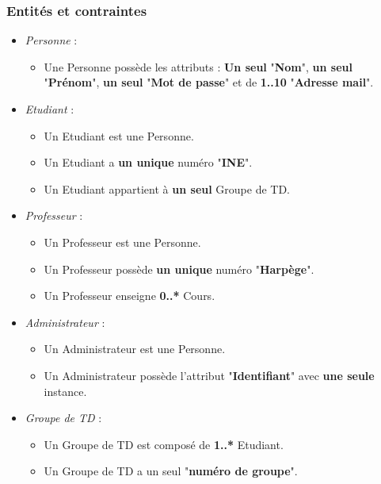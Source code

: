 \documentclass[a4paper, 11pt]{article}
\begin{document}
        \subsubsection{ Entités et contraintes}
        \begin{itemize}
        \item \textit{Personne} :
                \begin{itemize}
                \item Une Personne possède les attributs : \textbf{Un seul} "\textbf{Nom}", \textbf{un seul} "\textbf{Prénom}", \textbf{un seul} "\textbf{Mot de passe}" et de \textbf{1..10} "\textbf{Adresse mail}".
                \end{itemize}
        \item \textit{Etudiant} :
                \begin{itemize}
                \item Un Etudiant est une Personne.
                \item Un Etudiant a \textbf{un unique} numéro "\textbf{INE}".
                \item Un Etudiant appartient à \textbf{un seul} Groupe de TD.
                \end{itemize}
        \item \textit{Professeur} :
                \begin{itemize}
                \item Un Professeur est une Personne.
                \item Un Professeur possède \textbf{un unique} numéro "\textbf{Harpège}".
                \item Un Professeur enseigne \textbf{0..*} Cours.
                \end{itemize}
        \item \textit{Administrateur} :
                \begin{itemize}
                \item Un Administrateur est une Personne.
                \item Un Administrateur possède l'attribut "\textbf{Identifiant}" avec \textbf{une seule} instance.
                \end{itemize}
        \item \textit{Groupe de TD} :
                \begin{itemize}
                \item Un Groupe de TD est composé de \textbf{1..*} Etudiant.
                \item Un Groupe de TD a un seul "\textbf{numéro de groupe}".

\end{itemize}
\end{itemize}
\end{document}
